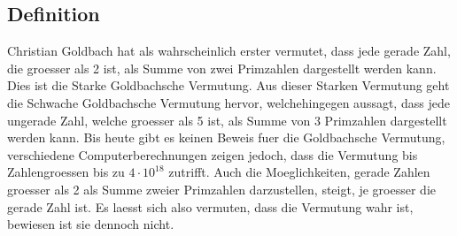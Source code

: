 \subsection{Definition}
Christian Goldbach hat als wahrscheinlich erster vermutet, dass jede gerade Zahl, die groesser als 2 ist, als Summe von zwei Primzahlen dargestellt werden kann. Dies ist die Starke Goldbachsche Vermutung. Aus dieser Starken Vermutung geht die Schwache Goldbachsche Vermutung hervor, welchehingegen aussagt, dass jede ungerade Zahl, welche groesser als 5 ist, als Summe von 3 Primzahlen dargestellt werden kann. Bis heute gibt es keinen Beweis fuer die Goldbachsche Vermutung, verschiedene Computerberechnungen zeigen jedoch, dass die Vermutung  bis Zahlengroessen bis zu $4\cdot10^18$ zutrifft. Auch die Moeglichkeiten, gerade Zahlen groesser als 2 als Summe zweier Primzahlen darzustellen, steigt, je groesser die gerade Zahl ist. Es laesst sich also vermuten, dass die Vermutung wahr ist, bewiesen ist sie dennoch nicht.
